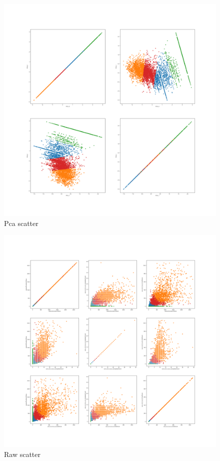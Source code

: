 \documentclass{article}
\begin{document}
\begin{figure}[H]
    \centering
    \includegraphics[width=1\columnwidth]{Crystal/progression_logtransform_zNonepca2k4/PCA Scatter.png}
    \caption{Pca scatter}
    \label{fig:Crystalprogressionpcascatter}
\end{figure}
\begin{figure}[H]
    \centering
    \includegraphics[width=1\columnwidth]{Crystal/progression_logtransform_zNonepca2k4/Raw Scatter.png}
    \caption{Raw scatter}
    \label{fig:Crystalprogressionrawscatter}
\end{figure}
\end{document}
